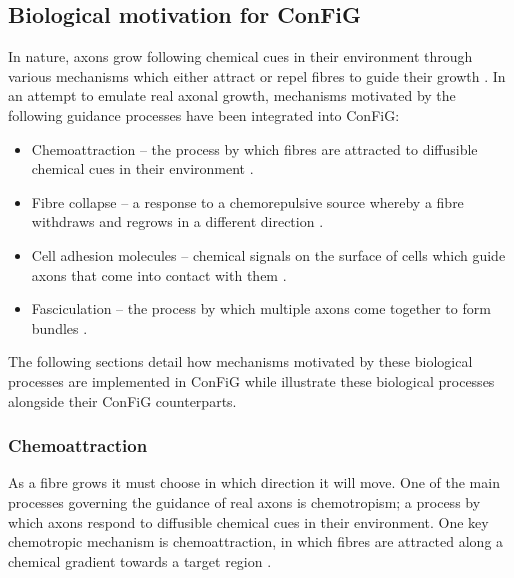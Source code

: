 \subsection{Biological motivation for \acs{ConFiG}}
\label{sec:config_biol_motiv}
In nature, axons grow following chemical cues in their environment through various mechanisms which either attract or repel fibres to guide their growth \cite{Dent2011,Lowery2009,Mortimer2008,Polleux2010,Price2017,Rauch2013,Sakisaka2005}. In an attempt to emulate real axonal growth, mechanisms motivated by the following guidance processes have been integrated into \ac{ConFiG}:
\begin{itemize}
  \item Chemoattraction – the process by which fibres are attracted to diffusible chemical cues in their environment \cite{Price2017,Mortimer2008}.
  \item Fibre collapse – a response to a chemorepulsive source whereby a fibre withdraws and regrows in a different direction \cite{Rauch2013}.
  \item Cell adhesion molecules – chemical signals on the surface of cells which guide axons that come into contact with them \cite{Sakisaka2005}.
  \item Fasciculation – the process by which multiple axons come together to form bundles \cite{Price2017,Smit2017}.
\end{itemize}
The following sections detail how mechanisms motivated by these biological processes are implemented in \ac{ConFiG} while  illustrate these biological processes alongside their \ac{ConFiG} counterparts.

\subsubsection{Chemoattraction}
\label{sec:config_chemoattraction}
As a fibre grows it must choose in which direction it will move. One of the main processes governing the guidance of real axons is chemotropism; a process by which axons respond to diffusible chemical cues in their environment. One key chemotropic mechanism is chemoattraction, in which fibres are attracted along a chemical gradient towards a target region \cite{Price2017}.

